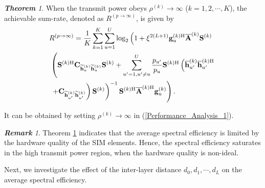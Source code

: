 \documentclass[lettersize,journal]{IEEEtran}
\theoremstyle{remark}
\newtheorem{theorem}{\quad \textbf{Theorem}}
\newtheorem{remark}{\quad \textbf{Remark}}
\begin{document}
\begin{theorem}\label{Theorem_2}
When the transmit power obeys $\rho^{(k)}\rightarrow\infty$ ($k=1,2,\cdots,K$), the achievable sum-rate, denoted as $R^{(p\rightarrow\infty)}$, is given by
\begin{align}\label{Performance_Analysis_2}
    \notag&R^{(p\rightarrow\infty)}=\frac{1}{K}\sum_{k=1}^K\sum_{u=1}^U\log_2\left(1+\xi^{2(L+1)}
    \mathbf{g}_u^{(k)\mathrm{H}}\overline{\mathbf{A}}^{(k)}\mathbf{S}^{(k)}\right.\\
    \notag&\left.\left(\mathbf{S}^{(k)\mathrm{H}}\mathbf{C}_{\widetilde{\mathbf{h}}_u^{(k)}
    \widetilde{\mathbf{h}}_u^{(k)}}\mathbf{S}^{(k)}+\sum_{u'=1,u'\neq u}^{U}\frac{p_{u'}}{p_u}
    \mathbf{S}^{(k)\mathrm{H}}\left(\overline{\mathbf{h}}_{u'}^{(k)}
    \overline{\mathbf{h}}_{u'}^{(k)\mathrm{H}}\right.\right.\right.\\
    &\left.\left.\left.+\mathbf{C}_{\widetilde{\mathbf{h}}_{u'}^{(k)}
    \widetilde{\mathbf{h}}_{u'}^{(k)}}\right)\mathbf{S}^{(k)}\right)^{-1}
    \mathbf{S}^{(k)\mathrm{H}}\overline{\mathbf{A}}^{(k)\mathrm{H}}\mathbf{g}_u^{(k)}\right).
\end{align}
\end{theorem}
\begin{IEEEproof}
    It can be obtained by setting $\rho^{(k)}\rightarrow\infty$ in (\ref{Performance_Analysis_1}).
\end{IEEEproof}

\begin{remark}\label{Remark_1}
Theorem \ref{Theorem_2} indicates that the average spectral efficiency is limited by the hardware quality of the SIM elements. Hence, the spectral efficiency saturates in the high transmit power region, when the hardware quality is non-ideal.
\end{remark}

Next, we investigate the effect of the inter-layer distance $d_0,d_1,\cdots,d_L$ on the average spectral efficiency.
\end{document}
